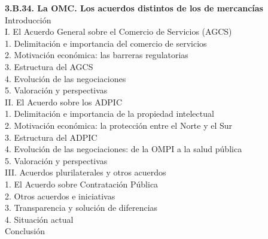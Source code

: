 \documentclass[11pt]{article}
\begin{document}
\begin{esquema}[unbreakable]
\textbf{3.B.34. La OMC. Los acuerdos distintos de los de mercancías}\\[2pt]
Introducción\\
I. El Acuerdo General sobre el Comercio de Servicios (AGCS)\\
\hspace*{1.5em}1. Delimitación e importancia del comercio de servicios\\
\hspace*{1.5em}2. Motivación económica: las barreras regulatorias\\
\hspace*{1.5em}3. Estructura del AGCS\\
\hspace*{1.5em}4. Evolución de las negociaciones\\
\hspace*{1.5em}5. Valoración y perspectivas\\
II. El Acuerdo sobre los ADPIC\\
\hspace*{1.5em}1. Delimitación e importancia de la propiedad intelectual\\
\hspace*{1.5em}2. Motivación económica: la protección entre el Norte y el Sur\\
\hspace*{1.5em}3. Estructura del ADPIC\\
\hspace*{1.5em}4. Evolución de las negociaciones: de la OMPI a la salud pública\\
\hspace*{1.5em}5. Valoración y perspectivas\\
III. Acuerdos plurilaterales y otros acuerdos\\
\hspace*{1.5em}1. El Acuerdo sobre Contratación Pública\\
\hspace*{1.5em}2. Otros acuerdos e iniciativas\\
\hspace*{1.5em}3. Transparencia y solución de diferencias\\
\hspace*{1.5em}4. Situación actual\\
Conclusión
\end{esquema}
\end{document}

